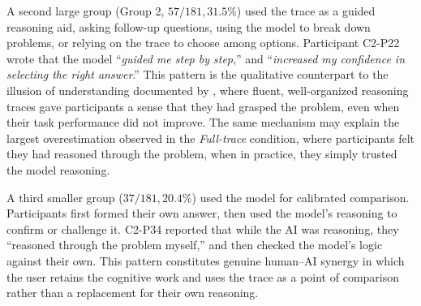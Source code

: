 \documentclass[manuscript,review,anonymous]{acmart}
\begin{document}

A second large group (Group 2, $57/181, 31.5\%$) used the trace as a guided reasoning aid, asking follow-up questions, using the model to break down problems, or relying on the trace to choose among options. Participant C2-P22 wrote that the model ``\textit{guided me step by step},'' and ``\textit{increased my confidence in selecting the right answer}.''
This pattern is the qualitative counterpart to the illusion of understanding documented by \citet{fisher2021harder}, where fluent, well-organized reasoning traces gave participants a sense that they had grasped the problem, even when their task performance did not improve. The same mechanism may explain the largest overestimation observed in the \textit{Full-trace} condition, where participants felt they had reasoned through the problem, when in practice, they simply trusted the model reasoning.



A third smaller group ($37/181, 20.4\%$) used the model for calibrated comparison. Participants first formed their own answer, then used the model's reasoning to confirm or challenge it. C2-P34 reported that while the AI was reasoning, they ``reasoned through the problem myself,'' and then checked the model’s logic against their own. %
This pattern constitutes genuine human–AI synergy \cite{vaccaro2024combinations} in which the user retains the cognitive work and uses the trace as a point of comparison rather than a replacement for their own reasoning.
\end{document}
